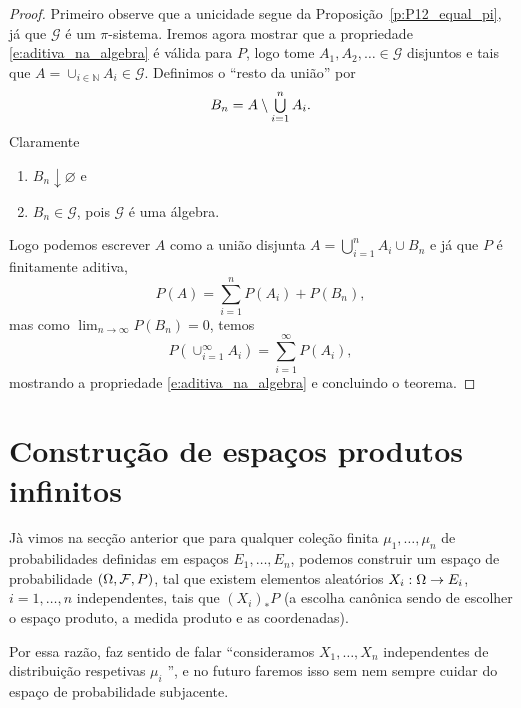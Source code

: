 \begin{proof}
  Primeiro observe que a unicidade segue da Proposição~\ref{p:P12_equal_pi}, já que $\mathcal{G}$ é um $\pi$-sistema.
  Iremos agora mostrar que a propriedade \eqref{e:aditiva_na_algebra} é válida para $P$, logo tome $A_1, A_2, \dots \in \mathcal{G}$ disjuntos e tais que $A = \cup_{i\in \mathbb{N}} A_i \in \mathcal{G}$.
  Definimos o ``resto da união'' por
  \begin{equation}
    B_n = A \setminus \operatorname*{{\textstyle \bigcup}}_{i=1}^n A_i.
  \end{equation}
  Claramente
  \begin{enumerate}[\quad a)]
  \item $B_n \downarrow \varnothing$ e
  \item $B_n \in \mathcal{G}$, pois $\mathcal{G}$ é uma álgebra.
  \end{enumerate}

  Logo podemos escrever $A$ como a união disjunta $A = \bigcup_{i=1}^n A_i \cup B_n$ e já que $P$ é finitamente aditiva,
  \begin{equation}
    P(A) = \sum_{i=1}^n P(A_i) + P(B_n),
  \end{equation}
  mas como $\lim_{n\to \infty} P(B_n) = 0$, temos
  \begin{equation}
    P(\cup_{i=1}^{\infty} A_i) = \sum_{i=1}^{\infty} P(A_i),
  \end{equation}
  mostrando a propriedade \eqref{e:aditiva_na_algebra} e concluindo o teorema.
\end{proof}

\section{Construção de espaços produtos infinitos}


Jà vimos na secção anterior que para qualquer coleção finita  $\mu_1,\dots,\mu_n$ de probabilidades definidas em espaços
$E_1,\dots,E_n$, podemos construir um espaço de probabilidade $(\Omega,{\mathcal F},P)$, tal que existem elementos aleatórios $X_i:\Omega\to E_i$,
$i=1,\dots,n$ independentes, tais que $(X_i)_*P$ (a escolha canônica sendo de escolher o espaço produto, a medida produto e as coordenadas).

\medskip

Por essa razão, faz sentido de falar ``consideramos $X_1,\dots,X_n$ independentes de distribuição respetivas $\mu_i$ '', e
no futuro faremos isso sem nem sempre cuidar do
espaço de probabilidade subjacente.

\medskip

